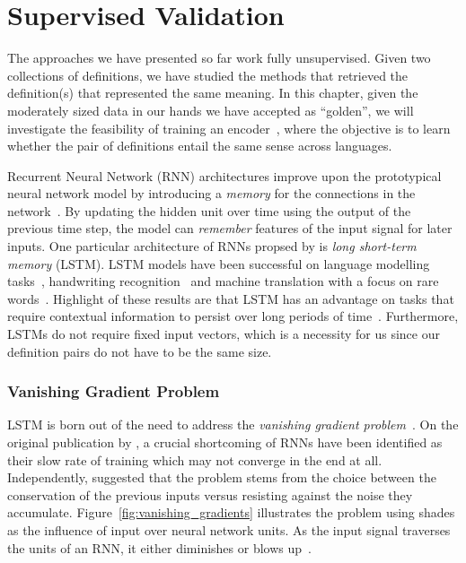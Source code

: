 
\chapter{Supervised Validation}%
\label{chap:supervised_validation}

The approaches we have presented so far work fully unsupervised.
Given two collections of definitions, we have studied the methods that retrieved the definition(s) that represented the same meaning.
In this chapter, given the moderately sized data in our hands we have accepted as \enquote{golden}, we will investigate the feasibility of training an encoder~\cite{sutskever_sequence_2014}, where the objective is to learn whether the pair of definitions entail the same sense across languages.

Recurrent Neural Network (RNN) architectures improve upon the prototypical neural network model by introducing a \emph{memory} for the connections in the network~\cite{rumelhart_learning_1986}.
By updating the hidden unit over time using the output of the previous time step, the model can \emph{remember} features of the input signal for later inputs.
One particular architecture of RNNs propsed by \textcite{hochreiter_long_1997} is \emph{long short-term memory} (LSTM).
LSTM models have been successful on language modelling tasks~\cite{sutskever_sequence_2014}, handwriting recognition~\cite{graves_unconstrained_2008,graves_novel_2009} and machine translation with a focus on rare words~\cite{luong_addressing_2014}.
Highlight of these results are that LSTM has an advantage on tasks that require contextual information to persist over long periods of time~\cite{graves_long_2012}.
Furthermore, LSTMs do not require fixed input vectors, which is a necessity for us since our definition pairs do not have to be the same size.

\subsection{Vanishing Gradient Problem}%
\label{sub:vanishing_gradient_problem}

LSTM is born out of the need to address the \emph{vanishing gradient problem}~\cite{hochreiter_long_1997, bengio_learning_1994}.
On the original publication by \textcite{hochreiter_long_1997}, a crucial shortcoming of RNNs have been identified as their slow rate of training which may not converge in the end at all.
Independently, \textcite{bengio_learning_1994} suggested that the problem stems from the choice between the conservation of the previous inputs versus resisting against the noise they accumulate.
Figure~\ref{fig:vanishing_gradients} illustrates the problem using shades as the influence of input over neural network units.
As the input signal traverses the units of an RNN, it either diminishes or blows up~\cite{graves_long_2012}.

